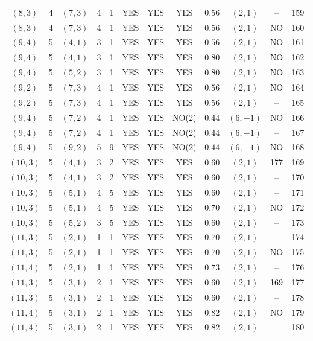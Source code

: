 \begin{longtable}{|c|c|c|c|c|c|c|c|c|c|c|c|}
$(8,3)$ & 4 & $(7,3)$ & 4 & 1 & YES & YES & YES & $0.56$ & $(2,1)$ & -- & 159\\
$(8,3)$ & 4 & $(7,3)$ & 4 & 1 & YES & YES & YES & $0.56$ & $(2,1)$ & NO & 160\\
$(9,4)$ & 5 & $(4,1)$ & 3 & 1 & YES & YES & YES & $0.56$ & $(2,1)$ & NO & 161\\
$(9,4)$ & 5 & $(4,1)$ & 3 & 1 & YES & YES & YES & $0.80$ & $(2,1)$ & NO & 162\\
$(9,4)$ & 5 & $(5,2)$ & 3 & 1 & YES & YES & YES & $0.80$ & $(2,1)$ & NO & 163\\
$(9,2)$ & 5 & $(7,3)$ & 4 & 1 & YES & YES & YES & $0.56$ & $(2,1)$ & NO & 164\\
$(9,2)$ & 5 & $(7,3)$ & 4 & 1 & YES & YES & YES & $0.56$ & $(2,1)$ & -- & 165\\
$(9,4)$ & 5 & $(7,2)$ & 4 & 1 & YES & YES & NO(2) & $0.44$ & $(6,-1)$ & NO & 166\\
$(9,4)$ & 5 & $(7,2)$ & 4 & 1 & YES & YES & NO(2) & $0.44$ & $(6,-1)$ & -- & 167\\
$(9,4)$ & 5 & $(9,2)$ & 5 & 9 & YES & YES & NO(2) & $0.44$ & $(6,-1)$ & NO & 168\\
$(10,3)$ & 5 & $(4,1)$ & 3 & 2 & YES & YES & YES & $0.60$ & $(2,1)$ & 177 & 169\\
$(10,3)$ & 5 & $(4,1)$ & 3 & 2 & YES & YES & YES & $0.60$ & $(2,1)$ & -- & 170\\
$(10,3)$ & 5 & $(5,1)$ & 4 & 5 & YES & YES & YES & $0.60$ & $(2,1)$ & -- & 171\\
$(10,3)$ & 5 & $(5,1)$ & 4 & 5 & YES & YES & YES & $0.70$ & $(2,1)$ & NO & 172\\
$(10,3)$ & 5 & $(5,2)$ & 3 & 5 & YES & YES & YES & $0.60$ & $(2,1)$ & -- & 173\\
$(11,3)$ & 5 & $(2,1)$ & 1 & 1 & YES & YES & YES & $0.70$ & $(2,1)$ & -- & 174\\
$(11,3)$ & 5 & $(2,1)$ & 1 & 1 & YES & YES & YES & $0.70$ & $(2,1)$ & NO & 175\\
$(11,4)$ & 5 & $(2,1)$ & 1 & 1 & YES & YES & YES & $0.73$ & $(2,1)$ & -- & 176\\
$(11,3)$ & 5 & $(3,1)$ & 2 & 1 & YES & YES & YES & $0.60$ & $(2,1)$ & 169 & 177\\
$(11,3)$ & 5 & $(3,1)$ & 2 & 1 & YES & YES & YES & $0.60$ & $(2,1)$ & -- & 178\\
$(11,4)$ & 5 & $(3,1)$ & 2 & 1 & YES & YES & YES & $0.82$ & $(2,1)$ & NO & 179\\
$(11,4)$ & 5 & $(3,1)$ & 2 & 1 & YES & YES & YES & $0.82$ & $(2,1)$ & -- & 180\\

\end{longtable}
